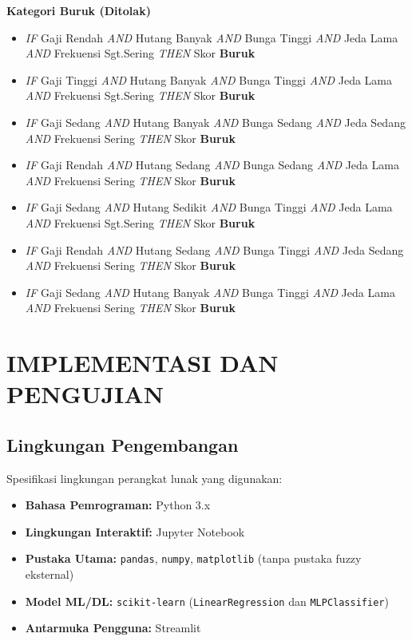 \documentclass[12pt,a4paper]{report}
\begin{document}
\vspace{4pt}
\noindent\textbf{Kategori Buruk (Ditolak)}
\begin{itemize}
  \item[R11] \textit{IF} Gaji Rendah \textit{AND} Hutang Banyak \textit{AND} Bunga Tinggi \textit{AND} Jeda Lama \textit{AND} Frekuensi Sgt.Sering \textit{THEN} Skor \textbf{Buruk}
  \item[R12] \textit{IF} Gaji Tinggi \textit{AND} Hutang Banyak \textit{AND} Bunga Tinggi \textit{AND} Jeda Lama \textit{AND} Frekuensi Sgt.Sering \textit{THEN} Skor \textbf{Buruk}
  \item[R13] \textit{IF} Gaji Sedang \textit{AND} Hutang Banyak \textit{AND} Bunga Sedang \textit{AND} Jeda Sedang \textit{AND} Frekuensi Sering \textit{THEN} Skor \textbf{Buruk}
  \item[R14] \textit{IF} Gaji Rendah \textit{AND} Hutang Sedang \textit{AND} Bunga Sedang \textit{AND} Jeda Lama \textit{AND} Frekuensi Sering \textit{THEN} Skor \textbf{Buruk}
  \item[R15] \textit{IF} Gaji Sedang \textit{AND} Hutang Sedikit \textit{AND} Bunga Tinggi \textit{AND} Jeda Lama \textit{AND} Frekuensi Sgt.Sering \textit{THEN} Skor \textbf{Buruk}
  \item[R21] \textit{IF} Gaji Rendah \textit{AND} Hutang Sedang \textit{AND} Bunga Tinggi \textit{AND} Jeda Sedang \textit{AND} Frekuensi Sering \textit{THEN} Skor \textbf{Buruk}
  \item[R22] \textit{IF} Gaji Sedang \textit{AND} Hutang Banyak \textit{AND} Bunga Tinggi \textit{AND} Jeda Lama \textit{AND} Frekuensi Sering \textit{THEN} Skor \textbf{Buruk}
\end{itemize}

\chapter{IMPLEMENTASI DAN PENGUJIAN}

\section{Lingkungan Pengembangan}

Spesifikasi lingkungan perangkat lunak yang digunakan:
\begin{itemize}
  \item \textbf{Bahasa Pemrograman:} Python 3.x
  \item \textbf{Lingkungan Interaktif:} Jupyter Notebook
  \item \textbf{Pustaka Utama:} \texttt{pandas}, \texttt{numpy},
        \texttt{matplotlib} (tanpa pustaka fuzzy eksternal)
  \item \textbf{Model ML/DL:} \texttt{scikit-learn}
        (\texttt{LinearRegression} dan \texttt{MLPClassifier})
  \item \textbf{Antarmuka Pengguna:} Streamlit
\end{itemize}
\end{document}
